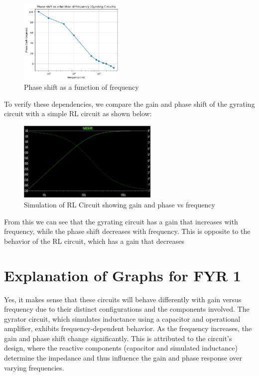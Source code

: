 \documentclass{article}
\begin{document}
\begin{figure}[H]
    \centering
    \includegraphics[width=0.45\textwidth]{img/Lab 9/1_3.png} %
    \caption{Phase shift as a function of frequency}
    \label{fig:phase}
\end{figure}

To verify these dependencies, we compare the gain and phase shift of the 
gyrating circuit with a simple RL circuit as shown below:

\begin{figure}[H]
    \centering
    \includegraphics[width=0.6\textwidth]{img/Lab 9/1_6.png} %
    \caption{Simulation of RL Circuit showing gain and phase vs frequency}
\end{figure}

From this we can see that the gyrating circuit has a gain that increases
with frequency, while the phase shift decreases with frequency. This is
opposite to the behavior of the RL circuit, which has a gain that decreases

\section*{Explanation of Graphs for FYR 1}

Yes, it makes sense that these circuits will behave differently with 
gain versus frequency due to their distinct configurations and the 
components involved. The gyrator circuit, which simulates inductance 
using a capacitor and operational amplifier, exhibits frequency-dependent 
behavior. As the frequency increases, the gain and phase shift change 
significantly. This is attributed to the circuit's design, where the 
reactive components (capacitor and simulated inductance) determine the 
impedance and thus influence the gain and phase response over varying 
frequencies.
\end{document}
